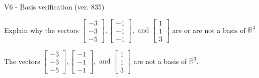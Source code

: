 \begin{exercise}
  \begin{exerciseTitle}V6 - Basis verification (ver. 835)\end{exerciseTitle}
  \begin{exerciseStatement}
    Explain why the vectors \(\left[\begin{array}{r}
-3 \\
-3 \\
-5
\end{array}\right] , \left[\begin{array}{r}
-1 \\
-1 \\
-1
\end{array}\right] , \text{ and } \left[\begin{array}{r}
1 \\
1 \\
3
\end{array}\right]\) are or are not a basis of \(\mathbb{R}^3\)	


  \end{exerciseStatement}
  \begin{exerciseAnswer}
   The vectors \(\left[\begin{array}{r}
-3 \\
-3 \\
-5
\end{array}\right] , \left[\begin{array}{r}
-1 \\
-1 \\
-1
\end{array}\right] , \text{ and } \left[\begin{array}{r}
1 \\
1 \\
3
\end{array}\right]\) 
  	 are not  a basis of \(\mathbb{R}^3\).
  


  \end{exerciseAnswer}
\end{exercise}